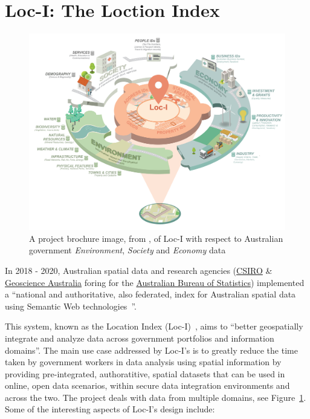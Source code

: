 \documentclass[runningheads]{llncs}
\begin{document}
\section{Loc-I: The Loction Index}\label{sec:loci}

\begin{figure}[htb]
    \centering
    \includegraphics[width=\linewidth]{images/loci-brochure.png}
    \caption{A project brochure image, from \cite{car_location_2019}, of Loc-I with respect to
    Australian government \textit{Environment}, \textit{Society} and \textit{Economy} data}
    \label{fig:loci-brochure}
\end{figure}

In 2018 - 2020, Australian spatial data and research agencies (\href{https://www.csiro.au}{CSIRO} \& \href{https://www.ga.gov.au}{Geoscience Australia} foring for the \href{https://www.abs.gov.au}{Australian Bureau of Statistics}) implemented a ``national and authoritative, also federated, index for Australian spatial data using Semantic Web technologies~\cite{car_location_2019}''.

This system, known as the Location Index (Loc-I)~\cite{car_location_2019}, aims to ``better geospatially integrate and analyze data across 
government portfolios and information domains''. The main use case addressed by Loc-I's is to greatly reduce the time taken by government 
workers in data analysis using spatial information by providing pre-integrated, authoratitive, spatial datasets that can be used in 
online, open data scenarios, within secure data integration environments and across the two. The project deals with data from multiple domains,
see Figure~\ref{fig:loci-brochure}. Some of the interesting aspects of Loc-I's design include:
\end{document}

